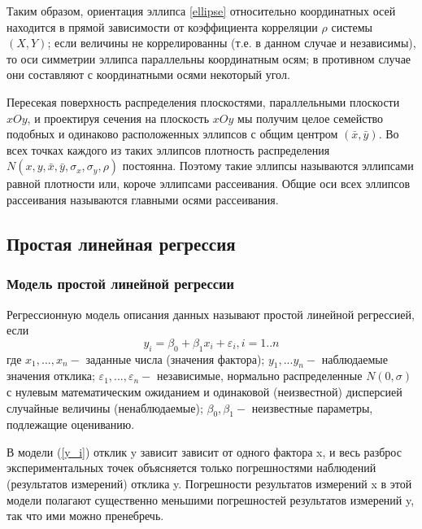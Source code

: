 \documentclass[12pt]{article}
\begin{document}
	Таким образом, ориентация эллипса \ref{ellipse} относительно координатных осей находится в прямой зависимости от коэффициента корреляции $\rho$ системы $(X,Y)$; если величины не коррелированны (т.е. в данном случае и независимы), то оси симметрии эллипса параллельны координатным осям; в противном случае они составляют с координатными осями некоторый угол.
	
	Пересекая поверхность распределения плоскостями, параллельными плоскости $xOy$, и проектируя сечения на плоскость $xOy$ мы получим целое семейство подобных и одинаково расположенных эллипсов с общим центром $(\bar{x},\bar{y})$. Во всех точках каждого из таких эллипсов плотность распределения $ N(x, y, \bar{x}, \bar{y}, \sigma_{x}, \sigma_{y}, \rho)$ постоянна. Поэтому такие эллипсы называются эллипсами равной плотности или, короче эллипсами рассеивания. Общие оси всех эллипсов рассеивания называются главными осями рассеивания.
	
	\subsection{Простая линейная регрессия}
	\subsubsection{Модель простой линейной регрессии}
	Регрессионную модель описания данных называют простой линейной регрессией, если
	\begin{equation}
		y_{i} = \beta_{0} + \beta_{1}x_{i} + \varepsilon_{i},  i = 1..n
		\label{y_i}
	\end{equation}
	где $x_1,...,x_n - $ заданные числа (значения фактора);
	$y_1,...y_n - $ наблюдаемые значения отклика;
	$\varepsilon_1,...,\varepsilon_n - $ независимые, нормально распределенные $N(0, \sigma)$ с нулевым математическим ожиданием и одинаковой (неизвестной) дисперсией случайные величины (ненаблюдаемые);
	$\beta_0, \beta_1 - $ неизвестные параметры, подлежащие оцениванию.
	
	В модели (\ref{y_i}) отклик y зависит зависит от одного фактора x, и весь разброс экспериментальных точек объясняется только погрешностями наблюдений (результатов измерений) отклика y. Погрешности результатов измерений x в этой модели полагают существенно меньшими погрешностей результатов измерений y, так что ими можно пренебречь.
	
\end{document}

